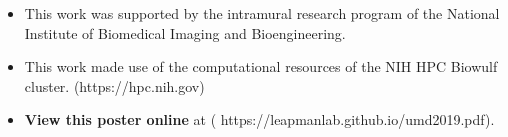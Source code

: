\documentclass[final]{beamer}
\newlength{\onecolwid}
\renewcommand{\emph}[1]{{\color{nibib2} #1}}
\begin{document}
\begin{frame}[t]
\begin{columns}[t]
\begin{column}{\onecolwid}
\begin{tcolorbox}[title=Acknowledgements]
\begin{itemize}
\item This work was supported by the intramural research program of the National Institute of Biomedical Imaging and Bioengineering.

\item This work made use of the computational resources of the NIH HPC Biowulf cluster. (https://hpc.nih.gov)

\item \textbf{View this poster online} at (\emph{https://leapmanlab.github.io/umd2019.pdf}).
\end{itemize}
\end{tcolorbox}

\end{column}

\end{columns}

\end{frame}
\end{document}
